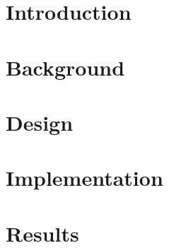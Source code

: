 \documentclass[12pt,twoside]{kau_report}
\begin{document}
\begin{frontmatter}
\begin{acknowledgements}




\end{acknowledgements}
\cleardoublepage

  \tableofcontents
  \cleardoublepage

  \listoffigures
  \cleardoublepage

  \listoftables
  \cleardoublepage
  
  \lstlistoflistings
  \cleardoublepage

\end{frontmatter}

\section{Introduction}
\label{sec:introduction}

\cleardoublepage

\section{Background}
\label{sec:background}

\cleardoublepage

\section{Design}
\label{sec:design}

\cleardoublepage

\section{Implementation}
\label{sec:implementation}

\cleardoublepage

\section{Results} %
\label{sec:resultevaluation}

\cleardoublepage
\end{document}
